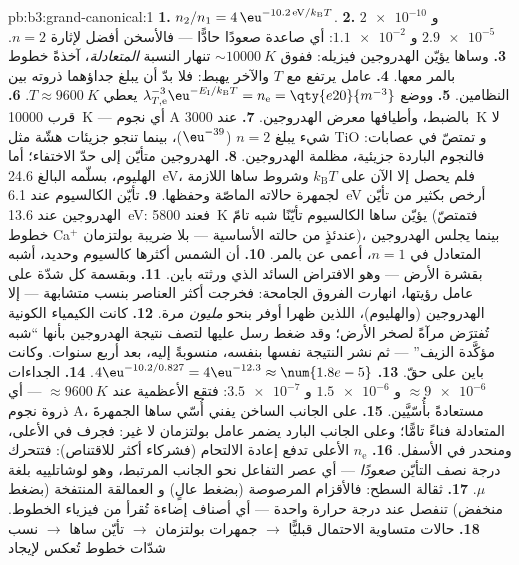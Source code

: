 \begin{solution}{pb:b3:grand-canonical:1}
\textbf{1.} $n_2/n_1 = 4\,\eu^{-10.2\,\text{eV}/k_{\text{B}}T}$.
\textbf{2.} $\num{2e-10}$ و $\num{2.9e-5}$ و $\num{1.1e-2}$: أي صاعدة
صعودًا حادًّا --- فالأسخن أفضل لإثارة $n = 2$.
\textbf{3.} وساها يؤيّن الهدروجين فيزيله: ففوق
$\sim\qty{10000}{K}$ تنهار النسبة \emph{المتعادلة}، آخذةً
خطوط بالمر معها.
\textbf{4.} عامل يرتفع مع $T$ والآخر يهبط: فلا بدّ أن يبلغ
جداؤهما ذروته بين النظامين.
\textbf{5.} ووضع $\lambda_{T,\text{e}}^{-3}\eu^{-E_{\text{I}}/
k_{\text{B}}T} = n_{\text{e}} = \qty{e20}{m^{-3}}$ يعطي $T
\approx \qty{9600}{K}$.
\textbf{6.} قرب \qty{10000}{K} --- أي نجوم A بالضبط، وأطيافها
معرض الهدروجين.
\textbf{7.} عند \qty{3000}{K} لا شيء يبلغ $n = 2$
($\eu^{-39}$)، بينما تنجو جزيئات هشّة مثل TiO و
تمتصّ في عصابات: فالنجوم الباردة جزيئية، مظلمة الهدروجين.
\textbf{8.} الهدروجين متأيّن إلى حدّ الاختفاء؛ أما الهليوم، بسلّمه
البالغ \qty{24.6}{eV}، فلم يحصل إلا الآن على $k_{\text{B}}T$ وشروط
ساها اللازمة لجمهرة حالاته الماصّة وحفظها.
\textbf{9.} تأيّن الكالسيوم عند \qty{6.1}{eV} أرخص بكثير
من تأيّن الهدروجين عند \qty{13.6}{eV}: فعند \qty{5800}{K} يؤيّن ساها
الكالسيوم تأيّنًا شبه تامّ (فتمتصّ خطوط Ca$^+$ عندئذٍ من
حالته الأساسية --- بلا ضريبة بولتزمان)، بينما يجلس الهدروجين المتعادل
في $n = 1$، أعمى عن بالمر.
\textbf{10.} أن الشمس أكثرها كالسيوم وحديد، أشبه
بقشرة الأرض --- وهو الافتراض السائد الذي ورثته باين.
\textbf{11.} وبقسمة كل شدّة على عامل رؤيتها،
انهارت الفروق الجامحة: فخرجت أكثر العناصر بنسب
متشابهة --- إلا الهدروجين (والهليوم)، اللذين ظهرا
أوفر بنحو \emph{مليون} مرة.
\textbf{12.} كانت الكيمياء الكونية تُفترَض مرآةً لصخر
الأرض؛ وقد ضغط رسل عليها لتصف نتيجة الهدروجين بأنها ``شبه
مؤكَّدة الزيف'' --- ثم نشر النتيجة نفسها
بنفسه، منسوبةً إليه، بعد أربع سنوات. وكانت باين على حقّ.
\textbf{13.} $4\eu^{-10.2/0.827} = 4\eu^{-12.3} \approx
\num{1.8e-5}$.
\textbf{14.} الجداءات $\approx \num{9e-6}$ و $\num{1.5e-6}$ و
$\num{3.5e-7}$: فتقع الأعظمية عند $\approx\qty{9600}{K}$ --- أي
ذروة نجوم A، مستعادةً بأُسّيَّين.
\textbf{15.} على الجانب الساخن يفني أُسّي ساها
الجمهرةَ المتعادلة فناءً تامًّا؛ وعلى الجانب البارد يضمر عامل
بولتزمان لا غير: فجرف في الأعلى، ومنحدر في الأسفل.
\textbf{16.} $n_{\text{e}}$ الأعلى تدفع إعادة الالتحام (فشركاء
أكثر للاقتناص): فتتحرك درجة نصف التأيّن \emph{صعودًا} ---
أي عصر التفاعل نحو الجانب المرتبط، وهو لوشاتلييه بلغة
$\mu$.
\textbf{17.} ثقالة السطح: فالأقزام المرصوصة (بضغط عالٍ) و
العمالقة المنتفخة (بضغط منخفض) تنفصل عند درجة حرارة واحدة --- أي أصناف
إضاءة تُقرأ من فيزياء الخطوط.
\textbf{18.} حالات متساوية الاحتمال قبليًّا $\to$ جمهرات بولتزمان
$\to$ تأيّن ساها $\to$ نسب شدّات خطوط تُعكس لإيجاد

\end{solution}
